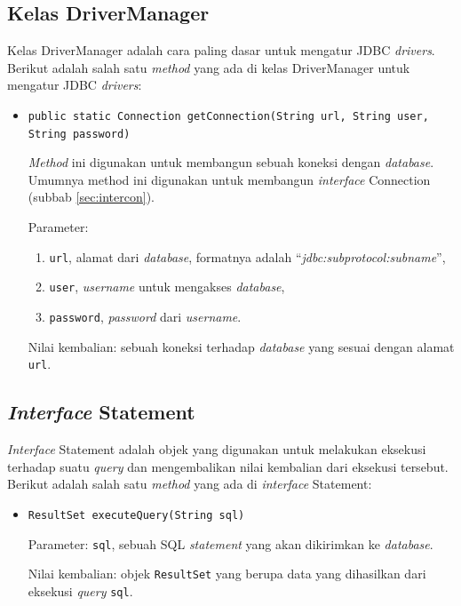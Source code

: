 \subsection{Kelas DriverManager}
\label{sec:drivermanager}
Kelas DriverManager adalah cara paling dasar untuk mengatur JDBC \textit{drivers}\cite{packagejavasql}. Berikut adalah salah satu \textit{method} yang ada di kelas DriverManager untuk mengatur JDBC \textit{drivers}:
\begin{itemize}
	\item \texttt{public static Connection getConnection(String url, String user, String password)}
	
	\textit{Method} ini digunakan untuk membangun sebuah koneksi dengan \textit{database}. Umumnya method ini digunakan untuk membangun \textit{interface} Connection (subbab \ref{sec:intercon}).
	
	Parameter:
	\begin{enumerate}
		\item \texttt{url}, alamat dari \textit{database}, formatnya adalah ``\textit{jdbc:\textit{subprotocol}:\textit{subname}}'',
		\item \texttt{user}, \textit{username} untuk mengakses \textit{database},
		\item \texttt{password}, \textit{password} dari \textit{username}.
	\end{enumerate}
	
	Nilai kembalian: sebuah koneksi terhadap \textit{database} yang sesuai dengan alamat \texttt{url}.
\end{itemize}

\subsection{\textit{Interface} Statement}
\label{sec:statement}
\textit{Interface} Statement adalah objek yang digunakan untuk melakukan eksekusi terhadap suatu \textit{query} dan mengembalikan nilai kembalian dari eksekusi tersebut\cite{packagejavasql}. Berikut adalah salah satu \textit{method} yang ada di \textit{interface} Statement:
\begin{itemize}
	\item \texttt{ResultSet executeQuery(String sql)}
	
	Parameter: \texttt{sql}, sebuah SQL \textit{statement} yang akan dikirimkan ke \textit{database}.
	
	Nilai kembalian: objek \texttt{ResultSet} yang berupa data yang dihasilkan dari eksekusi \textit{query} \texttt{sql}.
\end{itemize}

